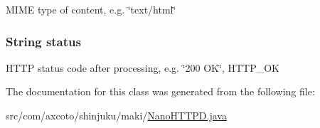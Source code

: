 \-M\-I\-M\-E type of content, e.\-g. \char`\"{}text/html\char`\"{} \hypertarget{classcom_1_1axcoto_1_1shinjuku_1_1maki_1_1_nano_h_t_t_p_d_1_1_response_a4e531c185af848083db0808335a78168}{
\subsubsection[{status}]{\setlength{\rightskip}{0pt plus 5cm}\-String {\bf status}}}\label{classcom_1_1axcoto_1_1shinjuku_1_1maki_1_1_nano_h_t_t_p_d_1_1_response_a4e531c185af848083db0808335a78168}
\-H\-T\-T\-P status code after processing, e.\-g. \char`\"{}200 O\-K\char`\"{}, \-H\-T\-T\-P\-\_\-\-O\-K 

\-The documentation for this class was generated from the following file\-:\begin{DoxyCompactItemize}
\item 
src/com/axcoto/shinjuku/maki/\hyperlink{_nano_h_t_t_p_d_8java}{\-Nano\-H\-T\-T\-P\-D.\-java}\end{DoxyCompactItemize}
